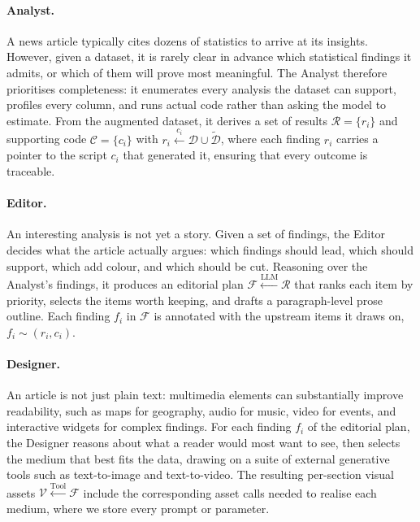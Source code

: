 \paragraph{Analyst.}
A news article typically cites dozens of statistics to arrive at its insights. However, given a dataset, it is rarely clear in advance which statistical findings it admits, or which of them will prove most meaningful. The Analyst therefore prioritises completeness: it enumerates every analysis the dataset can support, profiles every column, and runs actual code rather than asking the model to estimate. From the augmented dataset, it derives a set of results $\mathcal{R}=\{r_i\}$ and supporting code $\mathcal{C}=\{c_i\}$ with $r_i \xleftarrow{c_i} \mathcal{D} \cup \widetilde{\mathcal{D}}$, where each finding $r_i$ carries a pointer to the script $c_i$ that generated it,  ensuring that every outcome is traceable.

\paragraph{Editor.}
An interesting analysis is not yet a story. Given a set of findings, the Editor decides what the article actually argues: which findings should lead, which should support, which add colour, and which should be cut. Reasoning over the Analyst's findings, it produces an editorial plan $\mathcal{F} \xleftarrow{\text{LLM}} \mathcal{R}$ that ranks each item by priority, selects the items worth keeping, and drafts a paragraph-level prose outline. Each finding $f_i$ in $\mathcal{F}$ is annotated with the upstream items it draws on, $f_i \sim (r_i, c_i)$.

\paragraph{Designer.}
An article is not just plain text: multimedia elements can substantially improve readability, such as maps for geography, audio for music, video for events, and interactive widgets for complex findings. For each finding $f_i$ of the editorial plan, the Designer reasons about what a reader would most want to see, then selects the medium that best fits the data, drawing on a suite of external generative tools such as text-to-image and text-to-video. The resulting per-section visual assets $\mathcal{V} \xleftarrow{\text{Tool}} \mathcal{F}$ include the corresponding asset calls needed to realise each medium, where we store every prompt or parameter.

